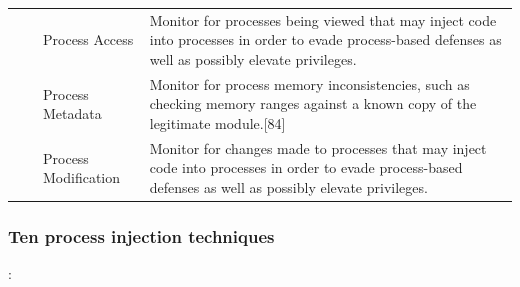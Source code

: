 \documentclass{article}
\begin{document}
\begin{table}[!ht]
\begin{tabular}{ |p{1.2cm}||p{2cm}|p{3cm}|p{8cm}|  }
        & & Process Access & Monitor for processes being viewed that may inject code into processes in order to
                             evade process-based defenses as well as possibly elevate privileges. \\
        & & Process Metadata & Monitor for process memory inconsistencies, such as checking memory ranges against a
                               known copy of the legitimate module.[84] \\
        & & Process Modification & Monitor for changes made to processes that may inject code into processes in order
                                   to evade process-based defenses as well as possibly elevate privileges. \\
  \hline
\end{tabular}
\label{table: Detection}
\end{table}

\pagebreak

\subsubsection{\textcite{Hosseini:2017} Ten process injection techniques}

\textbf{}: 
\end{document}

